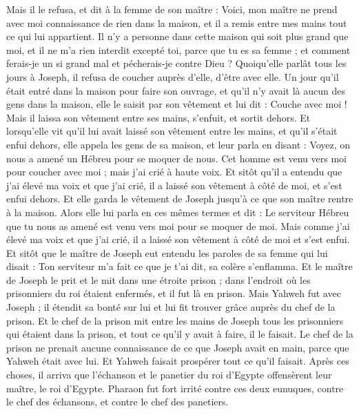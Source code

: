 \begin{multicols}{2}
Mais il le refusa, et dit à la femme de son maître : Voici, mon maître ne prend avec moi connaissance de rien dans la maison, et il a remis entre mes mains tout ce qui lui appartient.
Il n'y a personne dans cette maison qui soit plus grand que moi, et il ne m'a rien interdit excepté toi, parce que tu es sa femme ; et comment ferais-je un si grand mal et pécherais-je contre Dieu ?
Quoiqu'elle parlât tous les jours à Joseph, il refusa de coucher auprès d'elle, d'être avec elle.
Un jour qu'il était entré dans la maison pour faire son ouvrage, et qu'il n'y avait là aucun des gens dans la maison,
elle le saisit par son vêtement et lui dit : Couche avec moi ! Mais il laissa son vêtement entre ses mains, s'enfuit, et sortit dehors.
Et lorsqu'elle vit qu'il lui avait laissé son vêtement entre les mains, et qu'il s'était enfui dehors,
elle appela les gens de sa maison, et leur parla en disant : Voyez, on nous a amené un Hébreu pour se moquer de nous. Cet homme est venu vers moi pour coucher avec moi ; mais j'ai crié à haute voix.
Et sitôt qu'il a entendu que j'ai élevé ma voix et que j'ai crié, il a laissé son vêtement à côté de moi, et s'est enfui dehors.
Et elle garda le vêtement de Joseph jusqu'à ce que son maître rentre à la maison.
Alors elle lui parla en ces mêmes termes et dit : Le serviteur Hébreu que tu nous as amené est venu vers moi pour se moquer de moi.
Mais comme j'ai élevé ma voix et que j'ai crié, il a laissé son vêtement à côté de moi et s'est enfui.
Et sitôt que le maître de Joseph eut entendu les paroles de sa femme qui lui disait : Ton serviteur m'a fait ce que je t'ai dit, sa colère s'enflamma.
Et le maître de Joseph le prit et le mit dans une étroite prison ; dans l'endroit où les prisonniers du roi étaient enfermés, et il fut là en prison.
Mais Yahweh fut avec Joseph ; il étendit sa bonté sur lui et lui fit trouver grâce auprès du chef de la prison.
Et le chef de la prison mit entre les mains de Joseph tous les prisonniers qui étaient dans la prison, et tout ce qu'il y avait à faire, il le faisait.
Le chef de la prison ne prenait aucune connaissance de ce que Joseph avait en main, parce que Yahweh était avec lui. Et Yahweh faisait prospérer tout ce qu'il faisait.
\VerseOne{}Après ces choses, il arriva que l'échanson et le panetier du roi d'Egypte offensèrent leur maître, le roi d'Egypte.
Pharaon fut fort irrité contre ces deux eunuques, contre le chef des échansons, et contre le chef des panetiers.

\end{multicols}
